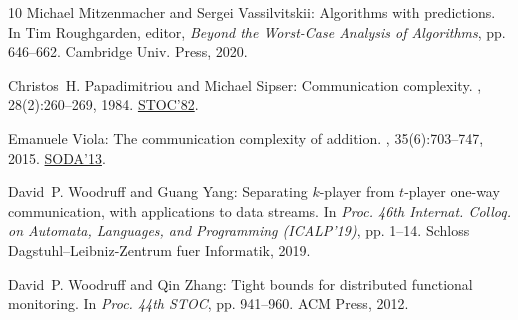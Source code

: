 \begin{thebibliography}{10}
{\sc Michael Mitzenmacher and Sergei Vassilvitskii}: Algorithms with
  predictions.
\newblock In {\sc Tim Roughgarden}, editor, {\em Beyond the Worst-Case Analysis
  of Algorithms}, pp. 646--662. Cambridge Univ. Press, 2020.
\newblock [\epfmtdoi{10.1017/9781108637435.037}]

{\sc Christos~H. Papadimitriou and Michael Sipser}: Communication complexity.
, 28(2):260--269, 1984.
\newblock \prelim \href{https://doi.org/10.1145/800070.802192}{STOC'82}.
\newblock [\epfmtdoi{10.1016/0022-0000(84)90069-2}]

{\sc Emanuele Viola}: The communication complexity of addition.
, 35(6):703--747, 2015.
\newblock \prelim
  \href{https://dl.acm.org/doi/abs/10.5555/2627817.2627863}{SODA'13}.
\newblock [\epfmtdoi{10.1007/s00493-014-3078-3}]

{\sc David~P. Woodruff and Guang Yang}: Separating $k$-player from $t$-player
  one-way communication, with applications to data streams.
\newblock In {\em Proc. 46th Internat. Colloq. on Automata, Languages, and
  Programming (ICALP'19)}, pp. 1--14. Schloss Dagstuhl--Leibniz-Zentrum fuer
  Informatik, 2019.

{\sc David~P. Woodruff and Qin Zhang}: Tight bounds for distributed functional
  monitoring.
\newblock In {\em Proc. 44th STOC}, pp. 941--960. ACM Press, 2012.
\newblock [\epfmtdoi{10.1145/2213977.2214063}]

\end{thebibliography}
